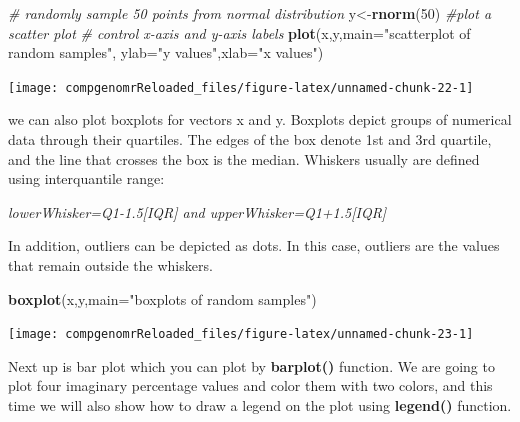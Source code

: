 \documentclass[12pt,]{krantz}
\newenvironment{Shaded}{\begin{snugshade}}{\end{snugshade}}
\newcommand{\CommentTok}[1]{\textcolor[rgb]{0.56,0.35,0.01}{\textit{#1}}}
\newcommand{\DataTypeTok}[1]{\textcolor[rgb]{0.13,0.29,0.53}{#1}}
\newcommand{\DecValTok}[1]{\textcolor[rgb]{0.00,0.00,0.81}{#1}}
\newcommand{\KeywordTok}[1]{\textcolor[rgb]{0.13,0.29,0.53}{\textbf{#1}}}
\newcommand{\NormalTok}[1]{#1}
\newcommand{\StringTok}[1]{\textcolor[rgb]{0.31,0.60,0.02}{#1}}
\theoremstyle{definition}
\theoremstyle{definition}
\theoremstyle{definition}
\theoremstyle{remark}
\begin{document}
\begin{Shaded}
\begin{Highlighting}[]
\CommentTok{# randomly sample 50 points from normal distribution}
\NormalTok{y<-}\KeywordTok{rnorm}\NormalTok{(}\DecValTok{50}\NormalTok{)}
\CommentTok{#plot a scatter plot}
\CommentTok{# control x-axis and y-axis labels}
\KeywordTok{plot}\NormalTok{(x,y,}\DataTypeTok{main=}\StringTok{"scatterplot of random samples"}\NormalTok{,}
        \DataTypeTok{ylab=}\StringTok{"y values"}\NormalTok{,}\DataTypeTok{xlab=}\StringTok{"x values"}\NormalTok{)}
\end{Highlighting}
\end{Shaded}

\begin{center}\texttt{[image: compgenomrReloaded\_files/figure-latex/unnamed-chunk-22-1]} \end{center}

we can also plot boxplots for vectors x and y. Boxplots depict groups of
numerical data through their quartiles. The edges of the box denote 1st
and 3rd quartile, and the line that crosses the box is the median.
Whiskers usually are defined using interquantile range:

\emph{lowerWhisker=Q1-1.5{[}IQR{]} and upperWhisker=Q1+1.5{[}IQR{]}}

In addition, outliers can be depicted as dots. In this case, outliers
are the values that remain outside the whiskers.

\begin{Shaded}
\begin{Highlighting}[]
 \KeywordTok{boxplot}\NormalTok{(x,y,}\DataTypeTok{main=}\StringTok{"boxplots of random samples"}\NormalTok{)}
\end{Highlighting}
\end{Shaded}

\begin{center}\texttt{[image: compgenomrReloaded\_files/figure-latex/unnamed-chunk-23-1]} \end{center}

Next up is bar plot which you can plot by \textbf{barplot()} function.
We are going to plot four imaginary percentage values and color them
with two colors, and this time we will also show how to draw a legend on
the plot using \textbf{legend()} function.
\end{document}
